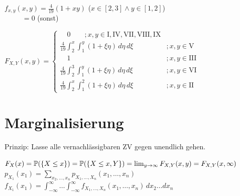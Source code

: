 \documentclass[8pt,a4paper,landscape]{extarticle}
\begin{document}
\begin{multicols*}{6}
\CheatsheetItemListStart
\CheatsheetItemListEnd
%
$f_{x,y}(x,y) = \frac{4}{19}(1 + xy)$ \quad ($x \in [2,3] \wedge  y \in [1,2]$) \\
$\text{ }\hspace{22pt} = 0$ \quad (sonst)
\vspace*{20pt}
%
\par\vspace*{35pt}
  \begingroup
    \setlength{\fboxsep}{1.5pt}
      \begin{varwidth}{\dimexpr{}\fboxsep\relax} %
        \ensuremath{   
        F_{X,Y}(x,y) = \begin{cases}    
          \quad 0 \quad \quad ; x,y \in \mathrm{I, IV, VII, VIII, IX} \\
          \frac{4}{19} \int_2^x \int_1^y (1 + \xi\eta) \, d\eta \, d\xi & ; x,y \in \mathrm{V} \\
          \quad 1 & ; x,y \in \mathrm{III} \\
          \frac{4}{19} \int_2^3 \int_1^y (1 + \xi\eta) \, d\eta \, d\xi & ; x,y \in \mathrm{VI} \\
          \frac{4}{19} \int_2^x \int_1^2 (1 + \xi\eta) \, d\eta \, d\xi & ; x,y \in \mathrm{II}
          \end{cases}
        }
      \end{varwidth}
    \vspace{-3pt}\raggedright\tiny
  \endgroup
  \par\vspace*{2pt}\noindent
  \vspace{12pt}

\section{Marginalisierung}

%
Prinzip: Lasse alle vernachlässigbaren ZV gegen unendlich gehen.
%
%
\par
%
$F_X(x) = \mathbb{P}(\{X \le x\}) = \\
\mathbb{P}(\{X \le x, Y\}) = \lim_{y \to \infty} F_{X,Y}(x, y) = F_{X,Y}(x, \infty)$ \\
$p_{X_1}(x_1) = \sum_{x_2, \dots, x_n} p_{X_1, \dots, X_n}(x_1, \dots, x_n)$ \\
$f_{X_1}(x_1) = \int_{-\infty}^{\infty} \dots \int_{-\infty}^{\infty} f_{X_1, \dots, X_n}(x_1, \dots, x_n) \, dx_2 \dots dx_n$ \\
 



\end{multicols*}
\end{document}
